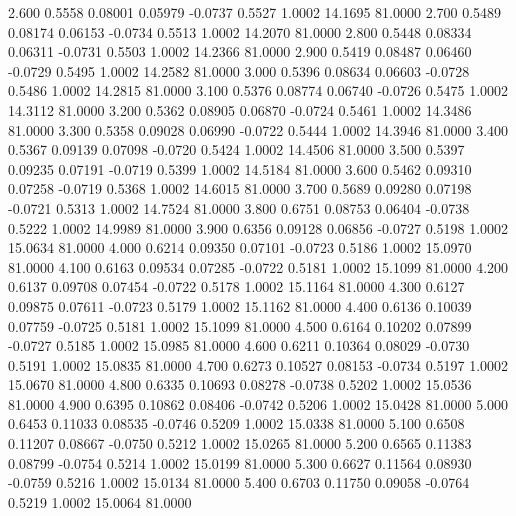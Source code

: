    2.600   0.5558   0.08001   0.05979  -0.0737   0.5527   1.0002  14.1695  81.0000
   2.700   0.5489   0.08174   0.06153  -0.0734   0.5513   1.0002  14.2070  81.0000
   2.800   0.5448   0.08334   0.06311  -0.0731   0.5503   1.0002  14.2366  81.0000
   2.900   0.5419   0.08487   0.06460  -0.0729   0.5495   1.0002  14.2582  81.0000
   3.000   0.5396   0.08634   0.06603  -0.0728   0.5486   1.0002  14.2815  81.0000
   3.100   0.5376   0.08774   0.06740  -0.0726   0.5475   1.0002  14.3112  81.0000
   3.200   0.5362   0.08905   0.06870  -0.0724   0.5461   1.0002  14.3486  81.0000
   3.300   0.5358   0.09028   0.06990  -0.0722   0.5444   1.0002  14.3946  81.0000
   3.400   0.5367   0.09139   0.07098  -0.0720   0.5424   1.0002  14.4506  81.0000
   3.500   0.5397   0.09235   0.07191  -0.0719   0.5399   1.0002  14.5184  81.0000
   3.600   0.5462   0.09310   0.07258  -0.0719   0.5368   1.0002  14.6015  81.0000
   3.700   0.5689   0.09280   0.07198  -0.0721   0.5313   1.0002  14.7524  81.0000
   3.800   0.6751   0.08753   0.06404  -0.0738   0.5222   1.0002  14.9989  81.0000
   3.900   0.6356   0.09128   0.06856  -0.0727   0.5198   1.0002  15.0634  81.0000
   4.000   0.6214   0.09350   0.07101  -0.0723   0.5186   1.0002  15.0970  81.0000
   4.100   0.6163   0.09534   0.07285  -0.0722   0.5181   1.0002  15.1099  81.0000
   4.200   0.6137   0.09708   0.07454  -0.0722   0.5178   1.0002  15.1164  81.0000
   4.300   0.6127   0.09875   0.07611  -0.0723   0.5179   1.0002  15.1162  81.0000
   4.400   0.6136   0.10039   0.07759  -0.0725   0.5181   1.0002  15.1099  81.0000
   4.500   0.6164   0.10202   0.07899  -0.0727   0.5185   1.0002  15.0985  81.0000
   4.600   0.6211   0.10364   0.08029  -0.0730   0.5191   1.0002  15.0835  81.0000
   4.700   0.6273   0.10527   0.08153  -0.0734   0.5197   1.0002  15.0670  81.0000
   4.800   0.6335   0.10693   0.08278  -0.0738   0.5202   1.0002  15.0536  81.0000
   4.900   0.6395   0.10862   0.08406  -0.0742   0.5206   1.0002  15.0428  81.0000
   5.000   0.6453   0.11033   0.08535  -0.0746   0.5209   1.0002  15.0338  81.0000
   5.100   0.6508   0.11207   0.08667  -0.0750   0.5212   1.0002  15.0265  81.0000
   5.200   0.6565   0.11383   0.08799  -0.0754   0.5214   1.0002  15.0199  81.0000
   5.300   0.6627   0.11564   0.08930  -0.0759   0.5216   1.0002  15.0134  81.0000
   5.400   0.6703   0.11750   0.09058  -0.0764   0.5219   1.0002  15.0064  81.0000
